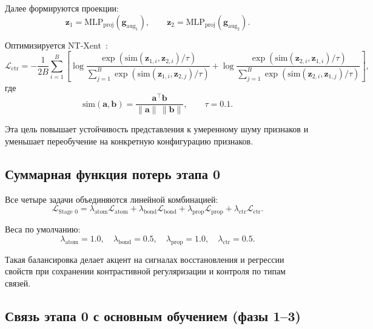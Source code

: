 \documentclass[11pt]{article}
\begin{document}
Далее формируются проекции:
\begin{equation*}
\mathbf{z}_1 = \mathrm{MLP}_{\text{proj}}(\mathbf{g}_{\text{aug}_1}),
\qquad
\mathbf{z}_2 = \mathrm{MLP}_{\text{proj}}(\mathbf{g}_{\text{aug}_2}).
\end{equation*}

Оптимизируется NT-Xent~\cite{chen2020}:
\begin{equation*}
\mathcal{L}_{\text{ctr}} = -\frac{1}{2B}\sum_{i=1}^{B}\left[
\log \frac{\exp(\mathrm{sim}(\mathbf{z}_{1,i}, \mathbf{z}_{2,i})/\tau)}
{\sum_{j=1}^{B}\exp(\mathrm{sim}(\mathbf{z}_{1,i}, \mathbf{z}_{2,j})/\tau)}
+ \log \frac{\exp(\mathrm{sim}(\mathbf{z}_{2,i}, \mathbf{z}_{1,i})/\tau)}
{\sum_{j=1}^{B}\exp(\mathrm{sim}(\mathbf{z}_{2,i}, \mathbf{z}_{1,j})/\tau)}
\right],
\end{equation*}
где
\begin{equation*}
\mathrm{sim}(\mathbf{a},\mathbf{b})=
\frac{\mathbf{a}^{\top}\mathbf{b}}{\|\mathbf{a}\|\,\|\mathbf{b}\|},
\qquad \tau=0.1.
\end{equation*}

Эта цель повышает устойчивость представления к умеренному шуму признаков и уменьшает переобучение на конкретную конфигурацию признаков.

\subsection{Суммарная функция потерь этапа 0}

Все четыре задачи объединяются линейной комбинацией:
\begin{equation*}
\mathcal{L}_{\text{Stage 0}} =
\lambda_{\text{atom}}\mathcal{L}_{\text{atom}} +
\lambda_{\text{bond}}\mathcal{L}_{\text{bond}} +
\lambda_{\text{prop}}\mathcal{L}_{\text{prop}} +
\lambda_{\text{ctr}}\mathcal{L}_{\text{ctr}}.
\end{equation*}

Веса по умолчанию:
\begin{equation*}
\lambda_{\text{atom}}=1.0,\quad
\lambda_{\text{bond}}=0.5,\quad
\lambda_{\text{prop}}=1.0,\quad
\lambda_{\text{ctr}}=0.5.
\end{equation*}

Такая балансировка делает акцент на сигналах восстановления и регрессии свойств при сохранении контрастивной регуляризации и контроля по типам связей.

\subsection{Связь этапа 0 с основным обучением (фазы 1--3)}
\end{document}
